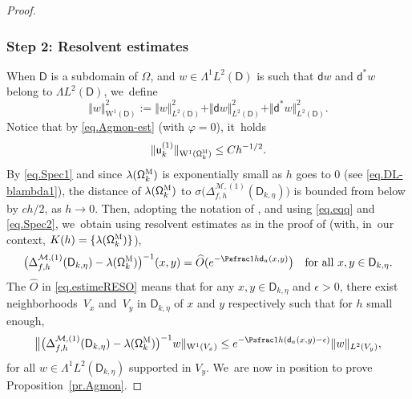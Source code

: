 \begin{proof}
\subsubsection*{Step 2: Resolvent estimates}
When $\mathsf D$ is a subdomain of $\Omega$, and $w\in \Lambda^1L^2(\mathsf D)$ is such that $ \mathsf d w$ and $\mathsf d^* w$ belong to $\Lambda L^2(\mathsf D)$, we~define
\begin{equation}\label{eq.norm1}
\Vert w\Vert _{\mathrm W^1(\mathsf D)}^2:= \Vert w\Vert _{L^2(\mathsf D)}^2+\Vert \mathsf dw\Vert _{L^2(\mathsf D)}^2+\Vert \mathsf d^*w\Vert _{L^2(\mathsf D)}^2.
\end{equation}
Notice that by \eqref{eq.Agmon-est} (with $\varphi=0$), it~holds
\begin{equation}\label{eq.estimeW1}
\Vert \mathsf u^{(1)}_k \Vert _{\mathrm W^1(\mathsf \Omega_k^{\textsc{M}})}\le Ch^{-1/2}.
\end{equation}
By \eqref{eq.Spec1} and since $\lambda(\mathsf \Omega_k^{\textsc{M}})$ is exponentially small as $h$ goes to $0$ (see \eqref{eq.DL-blambda1}), the distance of $\lambda(\mathsf \Omega_k^{\textsc{M}})$ to $\sigma \bigl(\Delta_{f,h}^{ \mathcal M,(1)} (\mathsf D_{k,\eta})\bigr)$ is bounded from below by $ch/2$, as $h\to 0$.
Then, adopting the notation of
\cite[p.\,56]{DiSj}, and using \eqref{eq.eqq} and \eqref{eq.Spec2}, we~obtain using resolvent estimates as in the proof of
\cite[Prop.\,6.5]{DiSj} (with, in~our context, $K(h)=
\{\lambda(\mathsf \Omega_k^{\textsc{M}}) \}$),
\begin{equation}\label{eq.estimeRESO}
\bigl(\Delta_{f,h}^{ \mathcal M,(1)} (\mathsf D_{k,\eta})- \lambda(\mathsf \Omega_k^{\textsc{M}}) \bigr)^{-1}(x,y)= \widehat O(e^{-\Psfrac 1h \mathsf d_a(x,y)}\bigr) \quad\text{for all } x,y \in \mathsf D_{k,\eta}.
\end{equation}
The $\widehat O$ in \eqref{eq.estimeRESO} means that for any $x,y\in \mathsf D_{k,\eta}$ and $\epsilon>0$, there exist neighborhoods~$V_x$ and~$V_y$ in $\mathsf D_{k,\eta}$ of $x$ and $y$ respectively such that for $h$ small enough,
\[
\big \Vert \bigl(\Delta_{f,h}^{ \mathcal M,(1)} (\mathsf D_{k,\eta})- \lambda(\mathsf \Omega_k^{\textsc{M}}) \bigr)^{-1}w\Vert_{\mathrm W^1(V_x)}\le e^{-\Psfrac 1h (\mathsf d_a(x,y)-\epsilon)}\Vert w\Vert_{L^2(V_y)},
\]
for all $w\!\in\! \Lambda^1L^2(\mathsf D_{k,\eta})$ supported in $V_y$. We~are now in position to prove Proposition~\ref{pr.Agmon}.


\end{proof}
